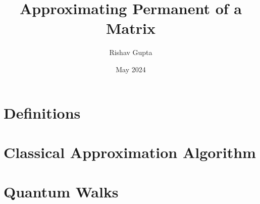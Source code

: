 \documentclass{article}
\title{Approximating Permanent of a Matrix }
\author{Rishav Gupta}
\date{May 2024}
\begin{document}
	
	\maketitle
	\tableofcontents
	\break
\section{Definitions}
	
	\break
\section{Classical Approximation Algorithm}
	
\section{Quantum Walks}
\end{document}
